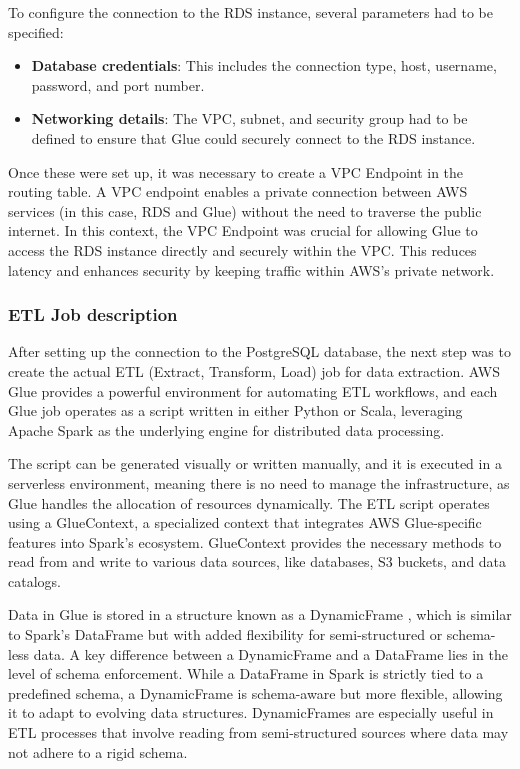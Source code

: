 To configure the connection to the \ac{RDS} instance, several parameters had to be specified:
\begin{itemize}
    \item \textbf{Database credentials}: This includes the connection type, host, username, password, and port number.
    \item \textbf{Networking details}: The \ac{VPC}, subnet, and security group had to be defined to ensure that Glue could securely connect to the \ac{RDS} instance.
\end{itemize}
Once these were set up, it was necessary to create a \ac{VPC} Endpoint in the routing table. A \ac{VPC} endpoint enables a private connection between \ac{AWS} services (in this case, \ac{RDS} and Glue) without the need to traverse the public internet. In this context, the \ac{VPC} Endpoint was crucial for allowing Glue to access the \ac{RDS} instance directly and securely within the \ac{VPC}. This reduces latency and enhances security by keeping traffic within \ac{AWS}'s private network.

\subsubsection{ETL Job description}
\label{sec:gluejobdesc}
After setting up the connection to the PostgreSQL database, the next step was to create the actual \ac{ETL} (Extract, Transform, Load) job for data extraction. \ac{AWS} Glue provides a powerful environment for automating \ac{ETL} workflows, and each Glue job operates as a script written in either Python or Scala, leveraging Apache Spark as the underlying engine for distributed data processing.

The script can be generated visually or written manually, and it is executed in a serverless environment, meaning there is no need to manage the infrastructure, as Glue handles the allocation of resources dynamically. The \ac{ETL} script operates using a GlueContext, a specialized context that integrates \ac{AWS} Glue-specific features into Spark's ecosystem. GlueContext provides the necessary methods to read from and write to various data sources, like databases, \ac{S3} buckets, and data catalogs.

Data in Glue is stored in a structure known as a DynamicFrame \cite{dyframe}, which is similar to Spark's DataFrame but with added flexibility for semi-structured or schema-less data. A key difference between a DynamicFrame and a DataFrame lies in the level of schema enforcement. While a DataFrame in Spark is strictly tied to a predefined schema, a DynamicFrame is schema-aware but more flexible, allowing it to adapt to evolving data structures. DynamicFrames are especially useful in \ac{ETL} processes that involve reading from semi-structured sources where data may not adhere to a rigid schema.

